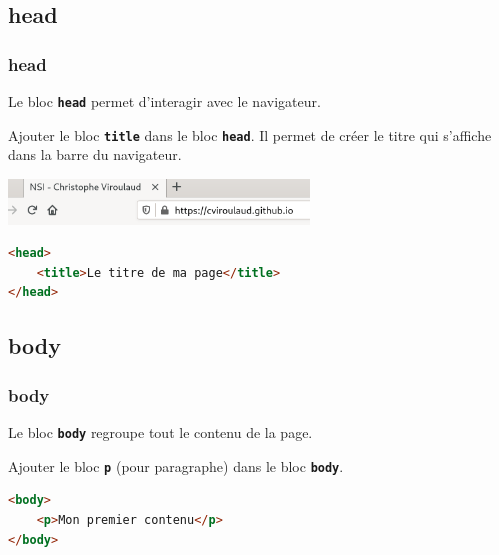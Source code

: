 \documentclass[svgnames,11pt]{beamer}
\begin{document}
\subsection{head}
\begin{frame}[fragile]
    \frametitle{head}

    Le bloc \textbf{\texttt{head}} permet d'interagir avec le navigateur.
    \begin{activite}
        Ajouter le bloc \textbf{\texttt{title}} dans le bloc \textbf{\texttt{head}}. Il permet de créer le titre qui s'affiche dans la barre du navigateur.
        \begin{center}
            \includegraphics[width=8cm]{ressources/head.png}

        \end{center}
        \begin{lstlisting}[language=html , basicstyle=\ttfamily\small, xleftmargin=2em, xrightmargin=2em]
<head>
    <title>Le titre de ma page</title>
</head>
\end{lstlisting}
    \end{activite}

\end{frame}
\subsection{body}
\begin{frame}[fragile]
    \frametitle{body}

    Le bloc \textbf{\texttt{body}} regroupe tout le contenu de la page.
    \begin{activite}
        Ajouter le bloc \textbf{\texttt{p}} (pour paragraphe) dans le bloc \textbf{\texttt{body}}.
        \begin{lstlisting}[language=html , basicstyle=\ttfamily\small, xleftmargin=2em, xrightmargin=2em]
<body>
    <p>Mon premier contenu</p>
</body>
\end{lstlisting}
    \end{activite}

\end{frame}
\end{document}

